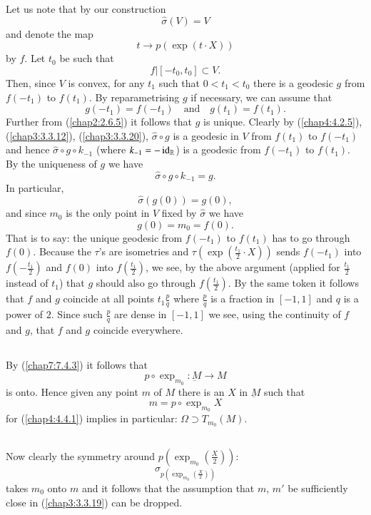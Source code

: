 Let us note that by our construction
$$
\widehat{\sigma}(V)=V
$$
and denote the map
$$
t\to p(\exp(t\cdot X))
$$
by $f$. Let $t_{0}$ be such that
$$
f|[-t_{0},t_{0}]\subset V.
$$
Then, since $V$ is convex, for any $t_{1}$ such that $0<t_{1}<t_{0}$
there is a geodesic $g$ from $f(-t_{1})$ to $f(t_{1})$. By
reparametrising $g$ if necessary, we can assume that
$$
g(-t_{1})=f(-t_{1})\quad\text{and}\quad g(t_{1})=f(t_{1}).
$$
Further from (\ref{chap2:2.6.5}) it follows that $g$ is unique. Clearly
by (\ref{chap4:4.2.5}), (\ref{chap3:3.3.12}), (\ref{chap3:3.3.20}),
$\widehat{\sigma}\circ g$ is a geodesic in $V$ from $f(t_{1})$ to
$f(-t_{1})$ and hence $\widehat{\sigma}\circ g\circ k_{-1}$ (where
$k_{-1}=-\operatorname{id}_{\mathbb{R}}$) is a geodesic from $f(-t_{1})$ to
$f(t_{1})$. By the uniqueness of $g$ we have
$$
\widehat{\sigma}\circ g\circ k_{-1}=g.
$$
In particular,
$$
\widehat{\sigma}(g(0))=g(0),
$$
and since $m_{0}$ is the only point in $V$ fixed by $\widehat{\sigma}$
we have
$$
g(0)=m_{0}=f(0).
$$
That \pageoriginale is to say: the unique geodesic from $f(-t_{1})$ to
$f(t_{1})$ has to go through $f(0)$. Because the $\tau$'s are
isometries and $\tau(\exp(\frac{t_{1}}{2}\cdot X))$ sends $f(-t_{1})$
into $f(-\frac{t_{1}}{2})$ and $f(0)$ into $f(\frac{t_{1}}{2})$, we
see, by the above argument (applied for $\frac{t_{1}}{2}$ instead of
$t_{1}$) that $g$ should also go through $f(\frac{t_{1}}{2})$. By the
same token it follows that $f$ and $g$ coincide at all points
$t_{1}\frac{p}{q}$ where $\frac{p}{q}$ is a fraction in $[-1,1]$ and
$q$ is a power of $2$. Since such $\frac{p}{q}$ are dense in $[-1,1]$
we see, using the continuity of $f$ and $g$, that $f$ and $g$ coincide
everywhere. 

\setcounter{subsection}{1}
\subsection{}\label{chap4:4.4.2}
By (\ref{chap7:7.4.3}) it follows that
$$
p\circ\exp_{m_{0}}:\underbar{M}\to M
$$
is onto. Hence given any point $m$ of $M$ there is an $X$ in
$\underbar{M}$ such that
$$
m=p\circ\exp_{m_{0}}X
$$
for (\ref{chap4:4.4.1}) implies in particular: $\Omega\supset
T_{m_{0}}(M)$.

\subsection{}\label{chap4:4.4.3}
Now clearly the symmetry around $p(\exp_{m_{0}}(\frac{X}{2}))$:
$$
\sigma_{p(\exp_{m_{0}}(\frac{X}{2}))}
$$
takes $m_{0}$ onto $m$ and it follows that the assumption that $m$,
$m'$ be sufficiently close in (\ref{chap3:3.3.19}) can be dropped.

